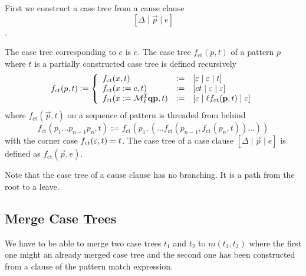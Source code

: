 First we construct a case tree from a cause clause
$$ [\Delta \mid \vec p \mid e] $$.

{
    \def\ct{f_\text{ct}}
    The case tree corresponding to $e$ is $e$. The case tree $\ct(p, t)$ of a
    pattern $p$ where $t$ is a partially constructed case tree is defined
    recursively
    $$
    \ct(p, t) := \left\{
        \begin{array}{lll}
            \ct(x,t)
            &:=&
            [\empty \mid \empty \mid t]
            \\
            \ct(x := c, t)
            &:=&
            [c t \mid \empty \mid \empty]
            \\
            \ct(x := \Make^\Ind_\ell \vec q \vec p, t)
            &:=&
            [\empty \mid \ell \ct(\vec p, t) \mid \empty]
        \end{array}
    \right.
    $$
    where $\ct(\vec p, t)$ on a sequence of pattern is threaded from behind
    $$
    \ct(p_1 \ldots p_{n-1} p_n, t)
    :=
    \ct(p_1, (\ldots \ct(p_{n-1}, \ct(p_n, t))\ldots))
    $$
    with the corner case $\ct(\empty, t) = t$.
    The case tree of a case clause $[\Delta \mid \vec p \mid e]$ is defined as
    $\ct(\vec p, e)$.
}

Note that the case tree of a cause clause has no branching.
It is a path from the root to a leave.



\subsection{Merge Case Trees}

We have to be able to merge two case trees $t_1$
and $t_2$ to $m(t_1, t_2)$ where the first one might an already merged case tree
and the second one has been constructed from a clause of the pattern match
expression.

